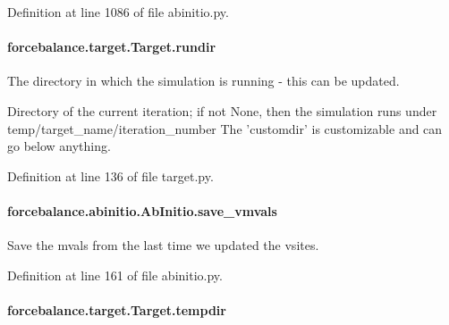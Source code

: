 Definition at line 1086 of file abinitio.\-py.

\hypertarget{classforcebalance_1_1target_1_1Target_a6872de5b2d4273b82336ea5b0da29c9e}{
\paragraph[{rundir}]{\setlength{\rightskip}{0pt plus 5cm}forcebalance.\-target.\-Target.\-rundir\hspace{0.3cm}{\ttfamily [inherited]}}}\label{classforcebalance_1_1target_1_1Target_a6872de5b2d4273b82336ea5b0da29c9e}


The directory in which the simulation is running -\/ this can be updated. 

Directory of the current iteration; if not None, then the simulation runs under temp/target\-\_\-name/iteration\-\_\-number The 'customdir' is customizable and can go below anything.

Definition at line 136 of file target.\-py.

\hypertarget{classforcebalance_1_1abinitio_1_1AbInitio_a22037bf43728fa45f387390005e0b131}{
\paragraph[{save\-\_\-vmvals}]{\setlength{\rightskip}{0pt plus 5cm}forcebalance.\-abinitio.\-Ab\-Initio.\-save\-\_\-vmvals\hspace{0.3cm}{\ttfamily [inherited]}}}\label{classforcebalance_1_1abinitio_1_1AbInitio_a22037bf43728fa45f387390005e0b131}


Save the mvals from the last time we updated the vsites. 



Definition at line 161 of file abinitio.\-py.

\hypertarget{classforcebalance_1_1target_1_1Target_aa1f01b5b78db253b5b66384ed11ed193}{
\paragraph[{tempdir}]{\setlength{\rightskip}{0pt plus 5cm}forcebalance.\-target.\-Target.\-tempdir\hspace{0.3cm}{\ttfamily [inherited]}}}\label{classforcebalance_1_1target_1_1Target_aa1f01b5b78db253b5b66384ed11ed193}


